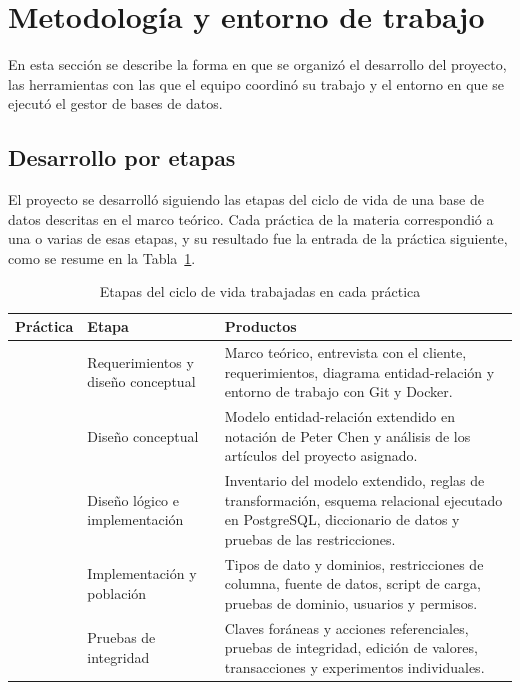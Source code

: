 \newpage

\section{Metodología y entorno de trabajo}
\label{sec:metodologia}

En esta sección se describe la forma en que se organizó el desarrollo del proyecto, las herramientas con las que el equipo coordinó su trabajo y el entorno en que se ejecutó el gestor de bases de datos.

\subsection{Desarrollo por etapas}

El proyecto se desarrolló siguiendo las etapas del ciclo de vida de una base de datos descritas en el marco teórico. Cada práctica de la materia correspondió a una o varias de esas etapas, y su resultado fue la entrada de la práctica siguiente, como se resume en la Tabla~\ref{tab:etapas}.

\begin{table}[H]
    \centering
    \small
    \begin{tabularx}{\textwidth}
        {
            >{\RaggedRight\arraybackslash}p{1.7cm}
            >{\RaggedRight\arraybackslash}p{3.6cm}
            >{\RaggedRight\arraybackslash}X
        }
        \toprule
        \textbf{Práctica} & \textbf{Etapa} & \textbf{Productos} \\
        \midrule
        1 & Requerimientos y diseño conceptual & Marco teórico, entrevista con el cliente, requerimientos, diagrama entidad-relación y entorno de trabajo con Git y Docker. \\
        2 & Diseño conceptual & Modelo entidad-relación extendido en notación de Peter Chen y análisis de los artículos del proyecto asignado. \\
        3 & Diseño lógico e implementación & Inventario del modelo extendido, reglas de transformación, esquema relacional ejecutado en PostgreSQL, diccionario de datos y pruebas de las restricciones. \\
        4 & Implementación y población & Tipos de dato y dominios, restricciones de columna, fuente de datos, script de carga, pruebas de dominio, usuarios y permisos. \\
        5 & Pruebas de integridad & Claves foráneas y acciones referenciales, pruebas de integridad, edición de valores, transacciones y experimentos individuales. \\
        \bottomrule
    \end{tabularx}
    \captionsetup{labelfont=bf, textfont=it, labelsep=newline, justification=raggedright, singlelinecheck=false}
    \caption{Etapas del ciclo de vida trabajadas en cada práctica}
    \label{tab:etapas}
\end{table}


